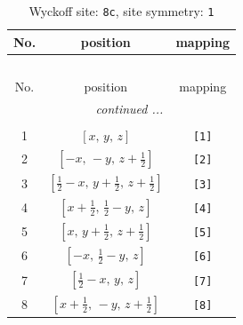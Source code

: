 \documentclass[fleqn,8pt]{jsarticle}
\begin{document}
\renewcommand{\arraystretch}{1.2}
\begin{longtable}{ccc}
\caption{Wyckoff site: {\tt 8c}, site symmetry: {\tt 1}}
 \\
 \hline \hline
No. & position & mapping \\ \hline \endfirsthead

\multicolumn{2}{l}{\tablename\ \thetable{}} \\
 \hline \hline
No. & position & mapping \\ \hline \endhead

 \hline \hline
\multicolumn{2}{r}{\footnotesize\it continued ...} \\ \endfoot

 \hline \hline
\multicolumn{2}{r}{} \\ \endlastfoot

1 & $\left[ x,\, y,\, z \right]$ & {\tt [1]} \\ \hline
2 & $\left[ - x,\, - y,\, z + \frac{1}{2} \right]$ & {\tt [2]} \\ \hline
3 & $\left[ \frac{1}{2} - x,\, y + \frac{1}{2},\, z + \frac{1}{2} \right]$ & {\tt [3]} \\ \hline
4 & $\left[ x + \frac{1}{2},\, \frac{1}{2} - y,\, z \right]$ & {\tt [4]} \\ \hline
5 & $\left[ x,\, y + \frac{1}{2},\, z + \frac{1}{2} \right]$ & {\tt [5]} \\ \hline
6 & $\left[ - x,\, \frac{1}{2} - y,\, z \right]$ & {\tt [6]} \\ \hline
7 & $\left[ \frac{1}{2} - x,\, y,\, z \right]$ & {\tt [7]} \\ \hline
8 & $\left[ x + \frac{1}{2},\, - y,\, z + \frac{1}{2} \right]$ & {\tt [8]} \\
\end{longtable}
\end{document}
